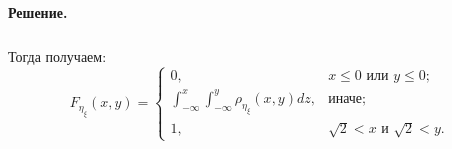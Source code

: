 \documentclass[specialist,
substylefile = spbu_report.rtx,
subf,href,colorlinks=true, 12pt]{disser}
\newenvironment{remark}{\paragraph{Замечание.}\itshape}{\hfill\\}
\newenvironment{solution}{\paragraph{Решение.}}{\hfill}
\begin{document}
\begin{solution}
\begin{align}
		\end{align}
		Тогда получаем:
		\begin{equation*}
			F_{\eta_\xi}(x,y) = 
			\begin{cases}
				0,& x\leqslant 0 \textrm{ или } y\leqslant 0;\\
				\int_{-\infty}^x\int_{-\infty}^y\rho_{\eta_\xi}(x,y)dz,& \textrm{иначе};\\
				1,& \sqrt{2}<x \textrm{ и } \sqrt{2}<y.
			\end{cases}
		\end{equation*}

\end{solution}
\end{document}
